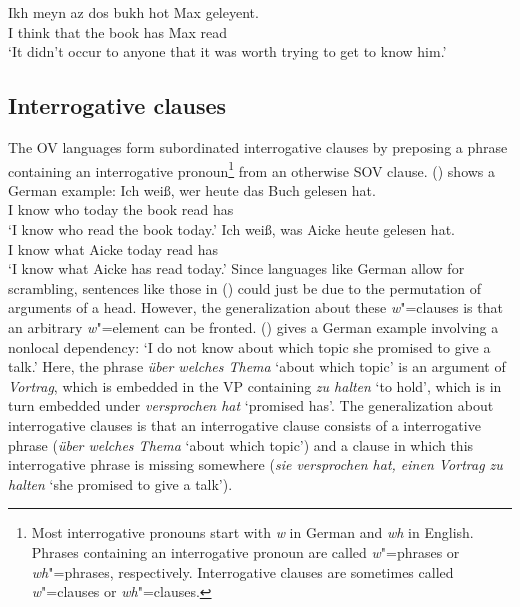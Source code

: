 \ex%
\gll Ikh meyn  az   dos bukh hot Max geleyent.\\
     I think that the book has Max read\\

\zl
\ea 
{}
\glt `It didn't occur to anyone that it was worth trying to get to know him.'
\z

\subsection{Interrogative clauses}
\label{sec-phen-interrogatives}

The OV languages form subordinated interrogative clauses by preposing a phrase containing an
interrogative pronoun\footnote{
Most interrogative pronouns start with \emph{w} in German and \emph{wh} in English. Phrases
containing an interrogative pronoun are called \emph{w}"=phrases or \emph{wh}"=phrases,
respectively. Interrogative clauses are sometimes called \emph{w}"=clauses or \emph{wh}"=clauses.
} from an
otherwise SOV clause. () shows a German example:
\eal
\ex 
\gll Ich weiß, wer heute das Buch gelesen hat.\\
     I know    who today the book read has\\
\glt `I know who read the book today.'
\ex 
\gll Ich weiß, was Aicke heute gelesen hat.\\
     I know    what Aicke today read has\\
\glt `I know what Aicke has read today.'
\zl
Since languages like German allow for scrambling, sentences like those in () could just be due
to the permutation of arguments of a head. However, the generalization about these \emph{w}"=clauses
is that an arbitrary \emph{w}"=element can be fronted. () gives a German example involving a nonlocal dependency:
\ea
\label{ex-wissen-Vortrag-halen-nonlocal}
\longexampleandlanguage{
\gll Ich weiß nicht, [über welches Thema]$_i$ sie versprochen hat, [[einen Vortrag \_$_i$] zu halten].\\
     I know not      \spacebr about which topic she promised has \hphantom{[[}a talk to  hold\\}{German}
\glt `I do not know about which topic she promised to give a talk.'
\z
Here, the phrase \emph{über welches Thema} `about which topic' is an argument of \emph{Vortrag},
which is embedded in the VP containing \emph{zu halten} `to hold', which is in turn embedded under
\emph{versprochen hat} `promised has'. The generalization about interrogative clauses is that an
interrogative clause consists of a interrogative phrase (\emph{über welches Thema} `about which
topic') and a clause in which this interrogative phrase is missing somewhere (\emph{sie versprochen
  hat, einen Vortrag zu halten} `she promised to give a talk').

